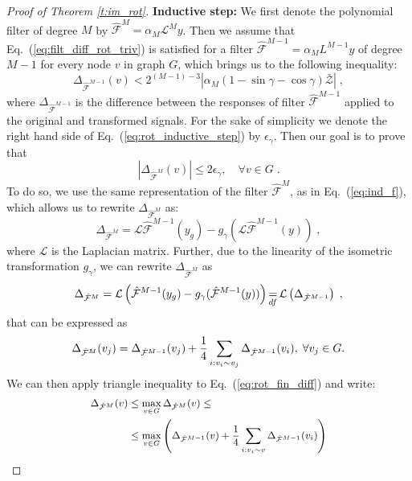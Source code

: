 \documentclass[10pt,journal,compsoc]{IEEEtran}
\newcommand{\df}{\mathop{=}\limits_{df}}
\newcommand{\hmF}{\hat{\mathcal{F}}}
\newcommand{\norm}[1]{\left|#1\right|}
\begin{document}
\begin{proof}[Proof of Theorem \ref{t:im_rot}]
		\textbf{Inductive step:}
		We first denote the polynomial filter of degree $M$ by $\hmF^{M} = \alpha_M \mathcal{L}^{M} y$. Then we assume that Eq.~(\ref{eq:filt_diff_rot_triv}) is satisfied for a filter $\hmF^{M-1} = \alpha_M L^{M-1} y$ of degree $M-1$ for every node $v$ in graph $G$, which brings us to the following inequality:
		\begin{equation}
		\Delta_{\hmF^{M-1}} (v) < 2^{(M-1)-3}\norm{\alpha_M (1 - \sin\gamma - \cos\gamma) \bar{\mathcal{Z}}}\;,
		\label{eq:rot_inductive_step}
		\end{equation}
		\noindent
		where $\Delta_{\hmF^{M-1}}$ is the difference between the responses of filter $\hmF^{M-1}$ applied to the original and transformed signals. For the sake of simplicity we denote the right hand side of Eq.~(\ref{eq:rot_inductive_step}) by $\epsilon_\gamma$. Then our goal is to prove that
		\begin{equation}
		\norm{\Delta_{\hmF^M} (v)} \leq 2 \epsilon_\gamma, \quad \forall v \in G\;.
		\end{equation}
		To do so, we use the same representation of the filter $\hmF^M$, as in Eq.~(\ref{eq:ind_f}), which allows us to rewrite $\Delta_{\hmF^M}$ as:
		\begin{equation}
		\Delta_{\hmF^{M}} = \mathcal{L} \hmF^{M-1}(y_g) - g_\gamma(\mathcal{L}\hmF^{M-1}(y)) \;,
		\end{equation}
		\noindent
		where $\mathcal{L}$ is the Laplacian matrix. Further, due to the linearity of the isometric transformation $g_\gamma$, we can rewrite $\Delta_{\hmF^{M}}$ as
		\begin{equation}
		\small
		\Delta_{\hmF^{M}} = \mathcal{L} \left(\hmF^{M-1}(y_g) - g_\gamma( \hmF^{M-1}(y))\right) \df \mathcal{L} \left(\Delta_{\hmF^{M-1}}\right)\;,
		\label{eq:ind_rot}
		\end{equation}
		\noindent
		that can be expressed as
		\begin{equation}
		\small
		\Delta_{\hmF^{M}} (v_j) = \Delta_{\hmF^{M-1}} (v_j) + \frac{1}{4} \sum\limits_{i: v_i \sim v_j} \Delta_{\hmF^{M-1}} (v_i), \; \forall v_j \in G.
		\label{eq:rot_fin_diff}
		\end{equation}
		\noindent
			We can then apply triangle inequality to Eq.~(\ref{eq:rot_fin_diff}) and write:
		\begin{equation}
		\small
		\begin{aligned}
		\Delta_{\hmF^{M}} (v) & \leq \max_{v \in G} \Delta_{\hmF^{M}} (v) \leq \\
		& \leq \max_{v \in G} \left( \Delta_{\hmF^{M-1}}(v) + \frac{1}{4} \sum\limits_{i: v_i \sim v} \Delta_{\hmF^{M-1}} (v_i) \right)

\end{aligned}
\end{equation}
\end{proof}
\end{document}
